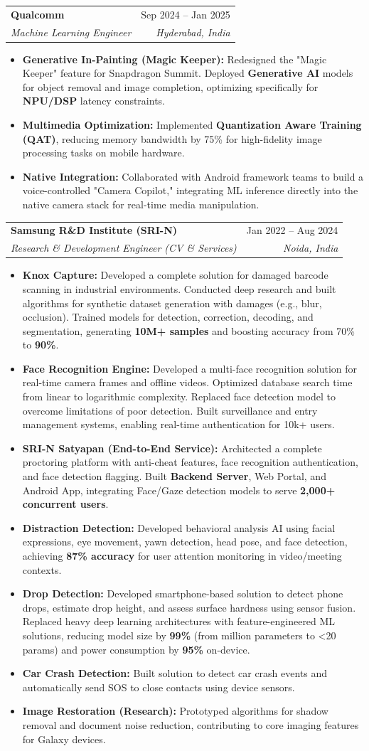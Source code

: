 \documentclass[10pt, letterpaper]{article}
\makeatletter
\newcommand{\resumeItem}[1]{
  \item\small{
    {#1 \vspace{-2pt}}
  }
}
\newcommand{\resumeSubheading}[4]{
  \vspace{-1pt}\item
    \begin{tabular*}{0.98\textwidth}[t]{l@{\extracolsep{\fill}}r}
      \textbf{#1} & {\small\color{darkgray} #2} \\
      \textit{\small#3} & \textit{\small\color{darkgray} #4} \\
    \end{tabular*}\vspace{-7pt}
}
\newcommand{\resumeItemListStart}{\begin{itemize}}
\newcommand{\resumeItemListEnd}{\end{itemize}\vspace{-5pt}}
\makeatother
\begin{document}
{    \resumeSubheading
      {Qualcomm}{Sep 2024 -- Jan 2025}
      {Machine Learning Engineer}{Hyderabad, India}
      \resumeItemListStart
        \resumeItem{\textbf{Generative In-Painting (Magic Keeper):} Redesigned the "Magic Keeper" feature for Snapdragon Summit. Deployed \textbf{Generative AI} models for object removal and image completion, optimizing specifically for \textbf{NPU/DSP} latency constraints.}
        \resumeItem{\textbf{Multimedia Optimization:} Implemented \textbf{Quantization Aware Training (QAT)}, reducing memory bandwidth by 75\% for high-fidelity image processing tasks on mobile hardware.}
        \resumeItem{\textbf{Native Integration:} Collaborated with Android framework teams to build a voice-controlled "Camera Copilot," integrating ML inference directly into the native camera stack for real-time media manipulation.}
      \resumeItemListEnd

    \resumeSubheading
      {Samsung R\&D Institute (SRI-N)}{Jan 2022 -- Aug 2024}
      {Research \& Development Engineer (CV \& Services)}{Noida, India}
      \resumeItemListStart
        \resumeItem{\textbf{Knox Capture:} Developed a complete solution for damaged barcode scanning in industrial environments. Conducted deep research and built algorithms for synthetic dataset generation with damages (e.g., blur, occlusion). Trained models for detection, correction, decoding, and segmentation, generating \textbf{10M+ samples} and boosting accuracy from 70\% to \textbf{90\%}.}
        \resumeItem{\textbf{Face Recognition Engine:} Developed a multi-face recognition solution for real-time camera frames and offline videos. Optimized database search time from linear to logarithmic complexity. Replaced face detection model to overcome limitations of poor detection. Built surveillance and entry management systems, enabling real-time authentication for 10k+ users.}
        \resumeItem{\textbf{SRI-N Satyapan (End-to-End Service):} Architected a complete proctoring platform with anti-cheat features, face recognition authentication, and face detection flagging. Built \textbf{Backend Server}, Web Portal, and Android App, integrating Face/Gaze detection models to serve \textbf{2,000+ concurrent users}.}
        \resumeItem{\textbf{Distraction Detection:} Developed behavioral analysis AI using facial expressions, eye movement, yawn detection, head pose, and face detection, achieving \textbf{87\% accuracy} for user attention monitoring in video/meeting contexts.}
        \resumeItem{\textbf{Drop Detection:} Developed smartphone-based solution to detect phone drops, estimate drop height, and assess surface hardness using sensor fusion. Replaced heavy deep learning architectures with feature-engineered ML solutions, reducing model size by \textbf{99\%} (from million parameters to <20 params) and power consumption by \textbf{95\%} on-device.}
        \resumeItem{\textbf{Car Crash Detection:} Built solution to detect car crash events and automatically send SOS to close contacts using device sensors.}
        \resumeItem{\textbf{Image Restoration (Research):} Prototyped algorithms for shadow removal and document noise reduction, contributing to core imaging features for Galaxy devices.}
      \resumeItemListEnd

}
\end{document}
